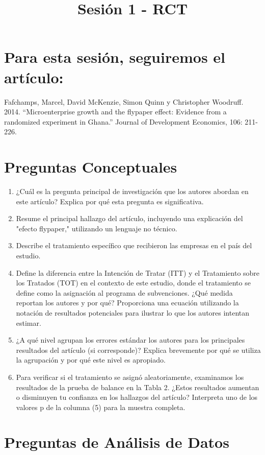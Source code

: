 \documentclass[11pt,a4paper,english]{article}
\title{Sesión 1 - RCT}
\author{}
\date{}
\begin{document}
\maketitle

\section*{Para esta sesión, seguiremos el artículo:} Fafchamps, Marcel, David
McKenzie, Simon Quinn y Christopher Woodruff. 2014. “Microenterprise growth and
the flypaper effect: Evidence from a randomized experiment in Ghana.” Journal of
Development Economics, 106: 211-226. 

\section*{Preguntas Conceptuales}

\begin{enumerate}
    \item ¿Cuál es la pregunta principal de investigación que los autores abordan en este artículo? Explica por qué esta pregunta es significativa.
    \item Resume el principal hallazgo del artículo, incluyendo una explicación del "efecto flypaper," utilizando un lenguaje no técnico.
    \item Describe el tratamiento específico que recibieron las empresas en el país del estudio.
    \item Define la diferencia entre la Intención de Tratar (ITT) y el Tratamiento sobre los Tratados (TOT) en el contexto de este estudio, donde el tratamiento se define como la asignación al programa de subvenciones. ¿Qué medida reportan los autores y por qué? Proporciona una ecuación utilizando la notación de resultados potenciales para ilustrar lo que los autores intentan estimar.
    \item ¿A qué nivel agrupan los errores estándar los autores para los principales resultados del artículo (si corresponde)? Explica brevemente por qué se utiliza la agrupación y por qué este nivel es apropiado.
    \item Para verificar si el tratamiento se asignó aleatoriamente, examinamos los resultados de la prueba de balance en la Tabla 2. ¿Estos resultados aumentan o disminuyen tu confianza en los hallazgos del artículo? Interpreta uno de los valores p de la columna (5) para la muestra completa.
\end{enumerate}

\section*{Preguntas de Análisis de Datos}
\end{document}
